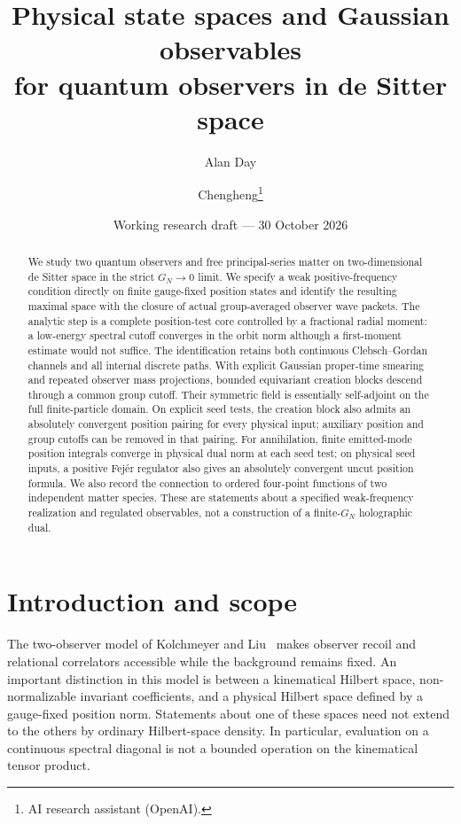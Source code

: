 \documentclass[11pt,a4paper]{article}
\title{Physical state spaces and Gaussian observables\\
for quantum observers in de Sitter space}
\author{Alan Day \and Chengheng\thanks{AI research assistant (OpenAI).}}
\date{Working research draft --- 30 October 2026}
\numberwithin{equation}{section}
\theoremstyle{definition}
\theoremstyle{remark}
\begin{document}
\maketitle
\begin{abstract}
We study two quantum observers and free principal-series matter on
two-dimensional de Sitter space in the strict $G_{\!N}\to0$ limit. We specify a
weak positive-frequency condition directly on finite gauge-fixed position
states and identify the resulting maximal space with the closure of actual
group-averaged observer wave packets. The analytic step is a complete
position-test core controlled by a fractional radial moment: a low-energy
spectral cutoff converges in the orbit norm although a first-moment estimate
would not suffice. The identification retains both continuous
Clebsch--Gordan channels and all internal discrete paths. With explicit
Gaussian proper-time smearing and repeated observer mass projections,
bounded equivariant creation blocks descend through a common group cutoff.
Their symmetric field is essentially self-adjoint on the full finite-particle
domain. On explicit seed tests, the creation block also admits an
absolutely convergent position pairing for every physical input; auxiliary
position and group cutoffs can be removed in that pairing. For annihilation,
finite emitted-mode position integrals converge in physical dual norm at
each seed test; on physical seed inputs, a positive Fej\'er regulator also
gives an absolutely convergent uncut position formula.
We also record the connection to ordered four-point functions of two
independent matter species. These are statements about a specified
weak-frequency realization and regulated observables, not a construction of
a finite-$G_N$ holographic dual.
\end{abstract}

\section{Introduction and scope}
The two-observer model of Kolchmeyer and Liu~\cite{KL} makes observer recoil
and relational correlators accessible while the background remains fixed.
An important distinction in this model is between a kinematical Hilbert
space, non-normalizable invariant coefficients, and a physical Hilbert
space defined by a gauge-fixed position norm. Statements about one of these
spaces need not extend to the others by ordinary Hilbert-space density.
In particular, evaluation on a continuous spectral diagonal is not a bounded
operation on the kinematical tensor product.
\end{document}

